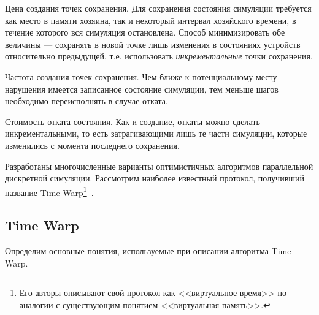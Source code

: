 \begin{description*}
    \item[Цена создания точек сохранения.] Для сохранения состояния симуляции требуется как место в памяти хозяина, так и некоторый интервал хозяйского времени, в течение которого вся симуляция остановлена. Способ минимизировать обе величины — сохранять в новой точке лишь изменения в состояниях устройств относительно предыдущей, т.е. использовать \textit{инкрементальные} точки сохранения.
    \item[Частота создания точек сохранения.] Чем ближе к потенциальному месту нарушения имеется записанное состояние симуляции, тем меньше шагов необходимо переисполнять в случае отката.
    \item[Стоимость отката состояния.] Как и создание, откаты можно сделать инкрементальными, то есть затрагивающими лишь те части симуляции, которые изменились с момента последнего сохранения.
\end{description*}

Разработаны многочисленные варианты оптимистичных алгоритмов параллельной дискретной симуляции. Рассмотрим наиболее известный протокол, получивший название Time Warp\footnote{Его авторы описывают свой протокол как <<виртуальное время>> по аналогии с существующим понятием <<виртуальная память>>.}~\cite{virtual-time}.

\subsection{Time Warp}

Определим основные понятия, используемые при описании алгоритма Time Warp.

